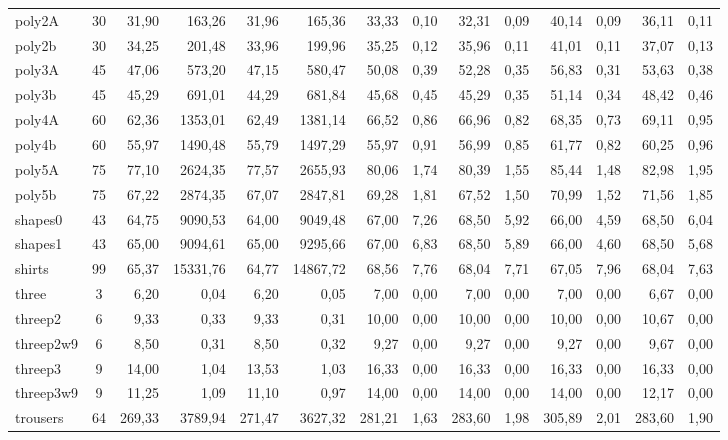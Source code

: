 \documentclass{article}
\newcommand{\lgray}{\cellcolor{lightgray}}
\begin{document}
\begin{adjustwidth}{-2.5 cm}{-2.5 cm}
\begin{threeparttable}[!htb]
{\begin{tabular}{|l|c|rr|rr|rr|rr|rr|rr|}
        poly2A &30 &\lgray31,90 &163,26 &31,96 &165,36 &33,33 &0,10 &32,31 &0,09 &40,14 &0,09 &36,11 &0,11 \\
        poly2b &30 &34,25 &201,48 &\lgray33,96 &199,96 &35,25 &0,12 &35,96 &0,11 &41,01 &0,11 &37,07 &0,13 \\
        poly3A &45 &\lgray47,06 &573,20 &47,15 &580,47 &50,08 &0,39 &52,28 &0,35 &56,83 &0,31 &53,63 &0,38 \\
        poly3b &45 &45,29 &691,01 &\lgray44,29 &681,84 &45,68 &0,45 &45,29 &0,35 &51,14 &0,34 &48,42 &0,46 \\
        poly4A &60 &\lgray62,36 &1353,01 &62,49 &1381,14 &66,52 &0,86 &66,96 &0,82 &68,35 &0,73 &69,11 &0,95 \\
        poly4b &60 &55,97 &1490,48 &\lgray55,79 &1497,29 &55,97 &0,91 &56,99 &0,85 &61,77 &0,82 &60,25 &0,96 \\
        poly5A &75 &\lgray77,10 &2624,35 &77,57 &2655,93 &80,06 &1,74 &80,39 &1,55 &85,44 &1,48 &82,98 &1,95 \\
        poly5b &75 &67,22 &2874,35 &\lgray67,07 &2847,81 &69,28 &1,81 &67,52 &1,50 &70,99 &1,52 &71,56 &1,85 \\
        shapes0 &43 &64,75 &9090,53 &\lgray64,00 &9049,48 &67,00 &7,26 &68,50 &5,92 &66,00 &4,59 &68,50 &6,04 \\
        shapes1 &43 &\lgray65,00 &9094,61 &\lgray65,00 &9295,66 &67,00 &6,83 &68,50 &5,89 &66,00 &4,60 &68,50 &5,68 \\
        shirts &99 &65,37 &15331,76 &\lgray64,77 &14867,72 &68,56 &7,76 &68,04 &7,71 &67,05 &7,96 &68,04 &7,63 \\
        three &3 &\lgray6,20 &0,04 &\lgray6,20 &0,05 &7,00 &0,00 &7,00 &0,00 &7,00 &0,00 &6,67 &0,00 \\
        threep2 &6 &\lgray9,33 &0,33 &\lgray9,33 &0,31 &10,00 &0,00 &10,00 &0,00 &10,00 &0,00 &10,67 &0,00 \\
        threep2w9 &6 &\lgray8,50 &0,31 &\lgray8,50 &0,32 &9,27 &0,00 &9,27 &0,00 &9,27 &0,00 &9,67 &0,00 \\
        threep3 &9 &14,00 &1,04 &\lgray13,53 &1,03 &16,33 &0,00 &16,33 &0,00 &16,33 &0,00 &16,33 &0,00 \\
        threep3w9 &9 &11,25 &1,09 &\lgray11,10 &0,97 &14,00 &0,00 &14,00 &0,00 &14,00 &0,00 &12,17 &0,00 \\
        trousers &64 &\lgray269,33 &3789,94 &271,47 &3627,32 &281,21 &1,63 &283,60 &1,98 &305,89 &2,01 &283,60 &1,90 \\
        \hline
    \end{tabular}
    }
    \label{tab:t4}
\end{threeparttable}\end{adjustwidth}
\end{document}
